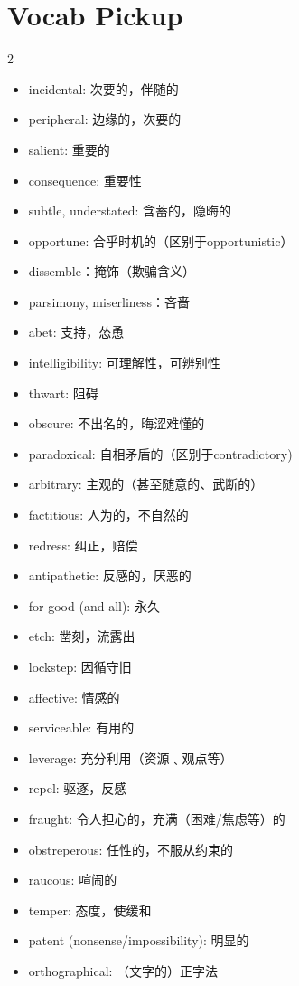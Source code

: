 \documentclass[11pt,space]{ctexart}
\begin{document}
\section*{Vocab Pickup}
\begin{multicols}{2}
    \begin{itemize}
    \item incidental: 次要的，伴随的
    \item peripheral: 边缘的，次要的
    \item salient: 重要的
    \item consequence: 重要性
    \item subtle, understated: 含蓄的，隐晦的
    \item opportune: 合乎时机的（区别于opportunistic）
    \item dissemble：掩饰（欺骗含义）
    \item parsimony, miserliness：吝啬
    \item abet: 支持，怂恿
    \item intelligibility: 可理解性，可辨别性
    \item thwart: 阻碍
    \item obscure: 不出名的，晦涩难懂的
    \item paradoxical: 自相矛盾的（区别于contradictory)
    \item arbitrary: 主观的（甚至随意的、武断的）
    \item factitious: 人为的，不自然的
    \item redress: 纠正，赔偿
    \item antipathetic: 反感的，厌恶的
    \item for good (and all): 永久
    \item etch: 凿刻，流露出
    \item lockstep: 因循守旧
    \item affective: 情感的
    \item serviceable: 有用的
    \item leverage: 充分利用（资源﹑观点等）
    \item repel: 驱逐，反感
    \item fraught: 令人担心的，充满（困难/焦虑等）的
    \item obstreperous: 任性的，不服从约束的
    \item raucous: 喧闹的
    \item temper: 态度，使缓和
    \item patent (nonsense/impossibility): 明显的
    \item orthographical: （文字的）正字法

\end{itemize}
\end{multicols}
\end{document}
